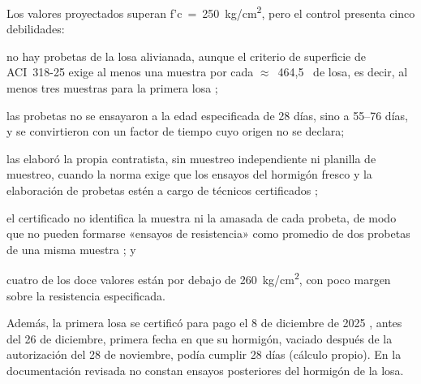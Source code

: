 \vspace{-6pt}
\endgroup

Los valores proyectados superan f'c~=~250~kg/cm\textsuperscript{2}, pero el control presenta cinco debilidades:
\begin{enumerate*}[label=(\roman*)]
  \item no hay probetas de la losa alivianada, aunque el criterio de superficie de ACI~318-25 exige al menos una muestra por cada $\approx$~464,5~\mdos{} de losa, es decir, al menos tres muestras para la primera losa \parencite[sección~26.12.2.1, p.~603]{aci318_2025};
  \item las probetas no se ensayaron a la edad especificada de 28 días, sino a 55--76 días, y se convirtieron con un factor de tiempo cuyo origen no se declara;
  \item las elaboró la propia contratista, sin muestreo independiente ni planilla de muestreo, cuando la norma exige que los ensayos del hormigón fresco y la elaboración de probetas estén a cargo de técnicos certificados \parencite[sección~26.12.1.1, p.~602]{aci318_2025};
  \item el certificado no identifica la muestra ni la amasada de cada probeta, de modo que no pueden formarse «ensayos de resistencia» como promedio de dos probetas de una misma muestra \parencite[sección~26.12.1.1, p.~601]{aci318_2025}; y
  \item cuatro de los doce valores están por debajo de 260~kg/cm\textsuperscript{2}, con poco margen sobre la resistencia especificada.
\end{enumerate*}
Además, la primera losa se certificó para pago el 8 de diciembre de 2025 \parencite[p.~16]{uatf2025pao2}, antes del 26 de diciembre, primera fecha en que su hormigón, vaciado después de la autorización del 28 de noviembre, podía cumplir 28 días (cálculo propio). En la documentación revisada no constan ensayos posteriores del hormigón de la losa.


